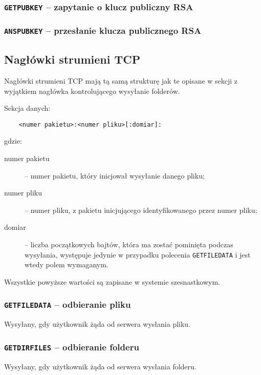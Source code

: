 \documentclass[11pt,leqno]{article}
\begin{document}
\subsubsection{\textnormal{\texttt{GETPUBKEY}} -- zapytanie o klucz publiczny RSA}
\subsubsection{\textnormal{\texttt{ANSPUBKEY}} -- przesłanie klucza publicznego RSA}

\subsection{Nagłówki strumieni TCP}\label{sec:tcpHeaders}

Nagłówki strumieni TCP mają tą samą strukturę jak te opisane w sekcji  z
wyjątkiem nagłówka kontrolującego wysyłanie folderów.

Sekcja danych:

\begin{verbatim}
	<numer pakietu>:<numer pliku>[:domiar]:
\end{verbatim}

gdzie:
\begin{description}
	\item[numer pakietu] -- numer pakietu, który inicjował wysyłanie danego pliku;
	\item[numer pliku] -- numer pliku, z pakietu inicjującego identyfikowanego przez numer pliku;
	\item[domiar] -- liczba początkowych bajtów, która ma zostać pominięta podczas wysyłania,
	występuje jedynie w przypadku polecenia \texttt{GETFILEDATA} i jest wtedy polem wymaganym.
\end{description}
Wszystkie powyższe wartości są zapisane w systemie szesnastkowym.

\subsubsection{\textnormal{\texttt{GETFILEDATA}} -- odbieranie pliku}

Wysyłany, gdy użytkownik żąda od serwera wysłania pliku.

\subsubsection{\textnormal{\texttt{GETDIRFILES}} -- odbieranie folderu}

Wysyłany, gdy użytkownik żąda od serwera wysłania folderu.
\end{document}
